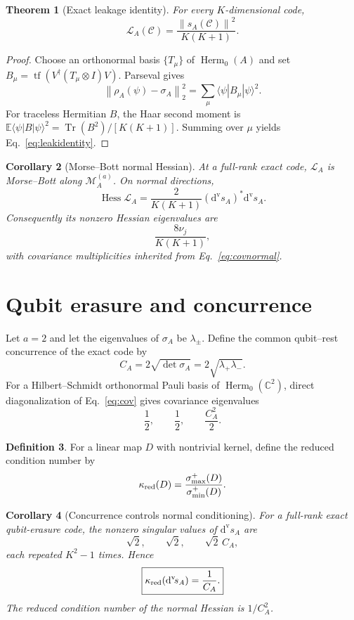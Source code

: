 \documentclass[11pt]{article}
\newtheorem{theorem}{Theorem}[section]
\newtheorem{corollary}[theorem]{Corollary}
\theoremstyle{definition}
\newtheorem{definition}[theorem]{Definition}
\newcommand{\cC}{\mathcal C}
\newcommand{\cM}{\mathcal M}
\newcommand{\cL}{\mathcal L}
\newcommand{\Herm}{\operatorname{Herm}}
\newcommand{\Tr}{\operatorname{Tr}}
\newcommand{\tf}{\operatorname{tf}}
\newcommand{\C}{\mathbb C}
\newcommand{\norm}[1]{\left\lVert #1\right\rVert}
\newcommand{\dvs}{\mathrm d^{\mathrm v}\!s}
\begin{document}
\begin{theorem}[Exact leakage identity]
For every $K$-dimensional code,
\begin{equation}
\boxed{\cL_A(\cC)=\frac{\norm{s_A(\cC)}^2}{K(K+1)}.}
\label{eq:leakidentity}
\end{equation}
\end{theorem}
\begin{proof}
Choose an orthonormal basis $\{T_\mu\}$ of $\Herm_0(A)$ and set $B_\mu=\tf(V^\dagger(T_\mu\otimes I)V)$. Parseval gives
\[
\norm{\rho_A(\psi)-\sigma_A}_2^2=\sum_\mu\langle\psi|B_\mu|\psi\rangle^2.
\]
For traceless Hermitian $B$, the Haar second moment is $\mathbb E\langle\psi|B|\psi\rangle^2=\Tr(B^2)/[K(K+1)]$. Summing over $\mu$ yields Eq.~\eqref{eq:leakidentity}.
\end{proof}

\begin{corollary}[Morse--Bott normal Hessian]
At a full-rank exact code, $\cL_A$ is Morse--Bott along $\cM_A^{(a)}$. On normal directions,
\begin{equation}
\operatorname{Hess}\cL_A=\frac{2}{K(K+1)}(\dvs_A)^*\dvs_A.
\end{equation}
Consequently its nonzero Hessian eigenvalues are
\begin{equation}
\frac{8\nu_j}{K(K+1)},
\end{equation}
with covariance multiplicities inherited from Eq.~\eqref{eq:covnormal}.
\end{corollary}

\section{Qubit erasure and concurrence}
Let $a=2$ and let the eigenvalues of $\sigma_A$ be $\lambda_\pm$. Define the common qubit--rest concurrence of the exact code by
\[
C_A=2\sqrt{\det\sigma_A}=2\sqrt{\lambda_+\lambda_-}.
\]
For a Hilbert--Schmidt orthonormal Pauli basis of $\Herm_0(\C^2)$, direct diagonalization of Eq.~\eqref{eq:cov} gives covariance eigenvalues
\[
\frac12,\qquad \frac12,\qquad \frac{C_A^2}{2}.
\]

\begin{definition}
For a linear map $D$ with nontrivial kernel, define the reduced condition number by
\[
\kappa_{\rm red}(D)=\frac{\sigma^+_{\max}(D)}{\sigma^+_{\min}(D)}.
\]
\end{definition}

\begin{corollary}[Concurrence controls normal conditioning]
For a full-rank exact qubit-erasure code, the nonzero singular values of $\dvs_A$ are
\begin{equation}
\sqrt2,\qquad \sqrt2,\qquad \sqrt2\,C_A,
\end{equation}
each repeated $K^2-1$ times. Hence
\begin{equation}
\boxed{\kappa_{\rm red}(\dvs_A)=\frac1{C_A}.}
\end{equation}
The reduced condition number of the normal Hessian is $1/C_A^2$.
\end{corollary}
\end{document}
